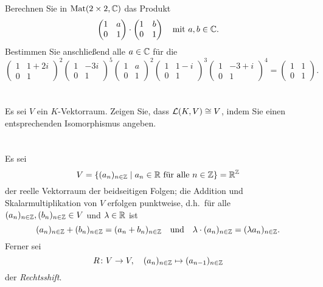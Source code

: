 \documentclass[a4paper,9pt]{extarticle}
\begin{document}
\section{}
Berechnen Sie in $\mathrm{Mat}(2 \times 2, \mathbb{C})$ das Produkt
\[
 \begin{pmatrix}
   1 & a \\
   0 & 1
 \end{pmatrix}
 \cdot
 \begin{pmatrix}
  1 & b \\
  0 & 1
 \end{pmatrix}
 \quad
 \text{mit $a,b \in \mathbb{C}$}.
\]
Bestimmen Sie anschließend alle $a \in \mathbb{C}$ für die
\[
  \begin{pmatrix}
   1 & 1+2i \\
   0 & 1
 \end{pmatrix}^2
  \begin{pmatrix}
   1 & -3i \\
   0 &  1
 \end{pmatrix}^5
  \begin{pmatrix}
   1 & a \\
   0 & 1
 \end{pmatrix}^2
  \begin{pmatrix}
   1 & 1-i \\
   0 & 1
 \end{pmatrix}^3
  \begin{pmatrix}
   1 & -3+i \\
   0 &  1
 \end{pmatrix}^4
 =
 \begin{pmatrix}
  1 & 1 \\
  0 & 1
 \end{pmatrix}.
\]





\section{}
Es sei $V$ ein $K$-Vektorraum. Zeigen Sie, dass $\mathcal{L}(K,V) \cong V$, indem Sie einen entsprechenden Isomorphismus angeben.





\section{}
Es sei
\[
 V = \{ (a_n)_{n \in \mathbb{Z}} \mid \text{$a_n \in \mathbb{R}$ für alle $n \in \mathbb{Z}$}\} = \mathbb{R}^{\mathbb{Z}}
\]
der reelle Vektorraum der beidseitigen Folgen; die Addition und Skalarmultiplikation von $V$ erfolgen punktweise, d.h.\ für alle $(a_n)_{n \in \mathbb{Z}}, (b_n)_{n \in \mathbb{Z}} \in V$ und $\lambda \in \mathbb{R}$ ist
\[
 (a_n)_{n \in \mathbb{Z}} + (b_n)_{n \in \mathbb{Z}} = (a_n + b_n)_{n \in \mathbb{Z}}
 \quad\text{und}\quad
 \lambda \cdot (a_n)_{n \in \mathbb{Z}} = (\lambda a_n)_{n \in \mathbb{Z}}.
\]
Ferner sei
\[
 R \colon V \to V, \quad (a_n)_{n \in \mathbb{Z}} \mapsto (a_{n-1})_{n \in \mathbb{Z}}
\]
der \emph{Rechtsshift}.
\end{document}
